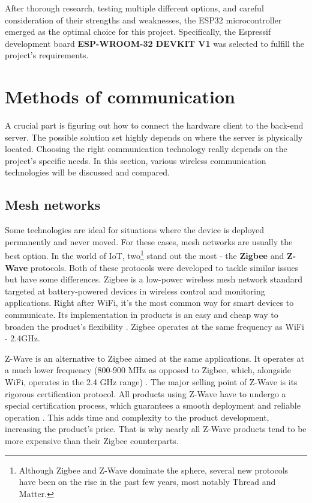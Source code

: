 \documentclass[FM,BP,EN,fonts]{tulthesis}
\begin{document}
After thorough research, testing multiple different options, and careful consideration of their strengths and weaknesses, the ESP32 microcontroller emerged as the optimal choice for this project. Specifically, the Espressif development board \textbf{ESP-WROOM-32 DEVKIT V1} was selected to fulfill the project's requirements.


\section{Methods of communication}
\label{sec:comm-methods}
A crucial part is figuring out how to connect the hardware client to the back-end server. The possible solution set highly depends on where the server is physically located. Choosing the right communication technology really depends on the project's specific needs. In this section, various wireless communication technologies will be discussed and compared.

\subsection{Mesh networks}
Some technologies are ideal for situations where the device is deployed permanently and never moved. For these cases, mesh networks are usually the best option. In the world of IoT, two\footnote{Although Zigbee and Z-Wave dominate the sphere, several new protocols have been on the rise in the past few years, most notably Thread and Matter.} stand out the most - the \textbf{Zigbee} and \textbf{Z-Wave} protocols. Both of these protocols were developed to tackle similar issues but have some differences. Zigbee is a low-power wireless mesh network standard targeted at battery-powered devices in wireless control and monitoring applications. Right after WiFi, it's the most common way for smart devices to communicate. Its implementation in products is an easy and cheap way to broaden the product's flexibility \cite{zigbee}. Zigbee operates at the same frequency as WiFi - 2.4GHz.

Z-Wave is an alternative to Zigbee aimed at the same applications. It operates at a much lower frequency (800-900 MHz as opposed to Zigbee, which, alongside WiFi, operates in the 2.4 GHz range) \cite{zwave}. The major selling point of Z-Wave is its rigorous certification protocol. All products using Z-Wave have to undergo a special certification process, which guarantees a smooth deployment and reliable operation \cite{zwave-certification}. This adds time and complexity to the product development, increasing the product's price. That is why nearly all Z-Wave products tend to be more expensive than their Zigbee counterparts.
\end{document}
